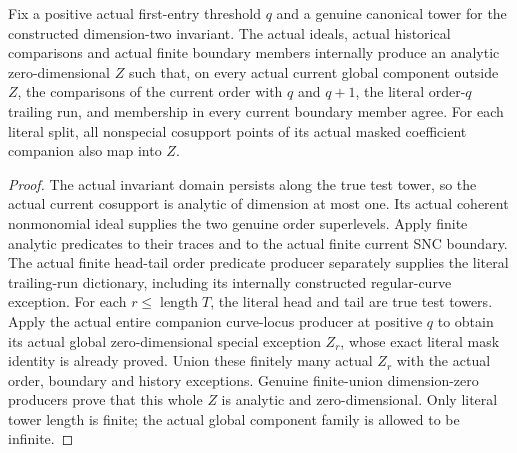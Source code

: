 \begin{lemma}
\label{hir:general-two-actual-finite-history-exception}
\leanok
Fix a positive actual first-entry threshold $q$ and a genuine canonical
tower for the constructed dimension-two invariant. The actual ideals,
actual historical comparisons and actual finite boundary members internally
produce an analytic zero-dimensional $Z$ such that, on every actual current
global component outside $Z$, the comparisons of the current order with
$q$ and $q+1$, the literal order-$q$ trailing run, and membership in every
current boundary member agree. For each literal split, all nonspecial
cosupport points of its actual masked coefficient companion also map into $Z$.
\end{lemma}
\begin{proof}
The actual invariant domain persists along the true test tower, so the
actual current cosupport is analytic of dimension at most one.
Its actual coherent nonmonomial ideal supplies the two genuine order
superlevels. Apply finite analytic predicates to their traces and to the
actual finite current SNC boundary. The actual finite head-tail order
predicate producer separately supplies the literal trailing-run dictionary,
including its internally constructed regular-curve exception.
For each $r\le\operatorname{length}T$, the literal head and tail are true
test towers. Apply the actual entire companion curve-locus producer at
positive $q$ to obtain its actual global zero-dimensional special exception
$Z_r$, whose exact literal mask identity is already proved. Union these
finitely many actual $Z_r$ with the actual order, boundary and history
exceptions. Genuine finite-union dimension-zero producers prove that this
whole $Z$ is analytic and zero-dimensional. Only literal tower length is
finite; the actual global component family is allowed to be infinite.
\end{proof}

